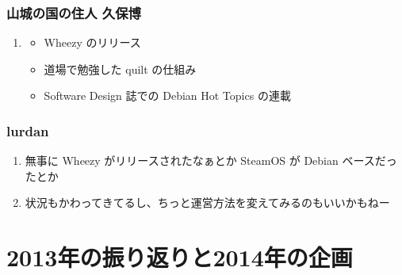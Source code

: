 \documentclass[cjk,dvipdfmx,10pt,compress,%
hyperref={bookmarks=true,bookmarksnumbered=true,bookmarksopen=false,%
colorlinks=false,%
pdftitle={第 79 回 関西 Debian 勉強会},%
pdfauthor={倉敷・のがた・佐々木・かわだ・八津尾},%
pdfsubject={資料},%
}]{beamer}
\begin{document}
\begin{frame}
  \frametitle{ 山城の国の住人 久保博 }
  \begin{enumerate}
  \item
    \begin{itemize}
    \item Wheezy のリリース
    \item 道場で勉強した quilt の仕組み
    \item Software Design 誌での Debian Hot Topics の連載
    \end{itemize}
  \end{enumerate}
\end{frame}

\begin{frame}
  \frametitle{ lurdan }
  \begin{enumerate}
  \item 無事に Wheezy がリリースされたなぁとか SteamOS が Debian ベースだったとか
  \item 状況もかわってきてるし、ちっと運営方法を変えてみるのもいいかもねー
  \end{enumerate}
\end{frame}



\section{2013年の振り返りと2014年の企画}
\end{document}

